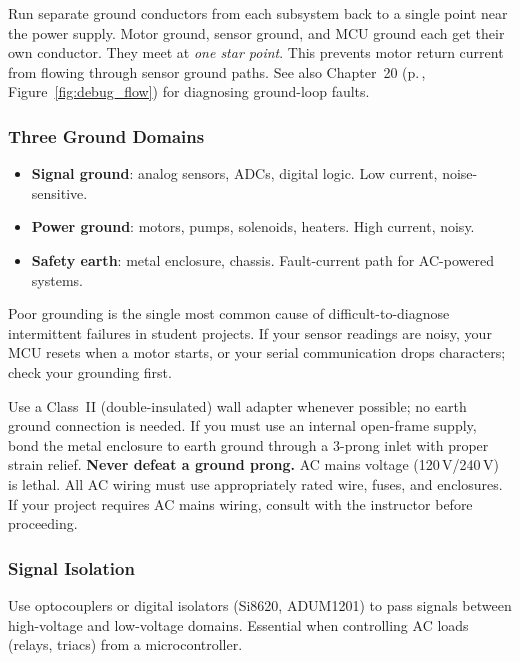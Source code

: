 \begin{keyconceptbox}
Run separate ground conductors from each subsystem back to a single point near the power supply. Motor ground, sensor ground, and MCU ground each get their own conductor. They meet at \emph{one star point}. This prevents motor return current from flowing through sensor ground paths. See also Chapter~20 (p.\,\pageref{ch:debug}, Figure~\ref{fig:debug_flow}) for diagnosing ground-loop faults.
\end{keyconceptbox}

\subsubsection{Three Ground Domains}
\begin{itemize}[nosep,leftmargin=1.5em]
  \item \textbf{Signal ground}: analog sensors, ADCs, digital logic. Low current, noise-sensitive.
  \item \textbf{Power ground}: motors, pumps, solenoids, heaters. High current, noisy.
  \item \textbf{Safety earth}: metal enclosure, chassis. Fault-current path for AC-powered systems.
\end{itemize}

\begin{warningbox}
Poor grounding is the single most common cause of difficult-to-diagnose intermittent failures in student projects. If your sensor readings are noisy, your MCU resets when a motor starts, or your serial communication drops characters; check your grounding first.
\end{warningbox}

\begin{warningbox}
Use a Class~II (double-insulated) wall adapter whenever possible; no earth ground connection is needed. If you must use an internal open-frame supply, bond the metal enclosure to earth ground through a 3-prong inlet with proper strain relief. \textbf{Never defeat a ground prong.} AC mains voltage (120\,V/240\,V) is lethal. All AC wiring must use appropriately rated wire, fuses, and enclosures. If your project requires AC mains wiring, consult with the instructor before proceeding.
\end{warningbox}

\subsubsection{Signal Isolation}
Use optocouplers or digital isolators (Si8620, ADUM1201) to pass signals between high-voltage and low-voltage domains. Essential when controlling AC loads (relays, triacs) from a microcontroller.


